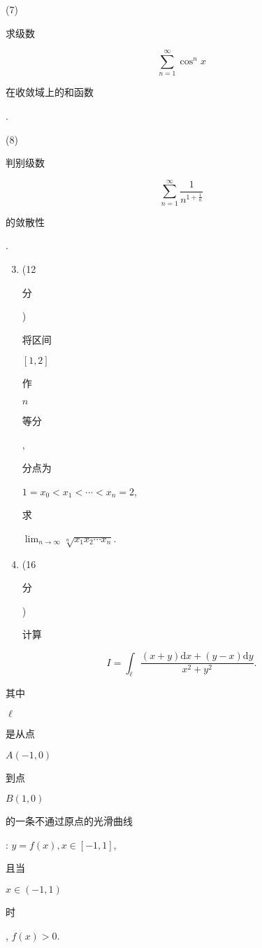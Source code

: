 \documentclass[10pt]{article}
\begin{document}
(7) \begin{CJK}{UTF8}{mj}求级数\end{CJK}
$$
\sum_{n=1}^{\infty} \cos ^{n} x
$$
\begin{CJK}{UTF8}{mj}在收敛域上的和函数\end{CJK}.

(8) \begin{CJK}{UTF8}{mj}判别级数\end{CJK}
$$
\sum_{n=1}^{\infty} \frac{1}{n^{1+\frac{1}{n}}}
$$
\begin{CJK}{UTF8}{mj}的敛散性\end{CJK}.

\begin{enumerate}
  \setcounter{enumi}{2}
  \item (12 \begin{CJK}{UTF8}{mj}分\end{CJK}) \begin{CJK}{UTF8}{mj}将区间\end{CJK} $[1,2]$ \begin{CJK}{UTF8}{mj}作\end{CJK} $n$ \begin{CJK}{UTF8}{mj}等分\end{CJK}, \begin{CJK}{UTF8}{mj}分点为\end{CJK} $1=x_{0}<x_{1}<\cdots<x_{n}=2$, \begin{CJK}{UTF8}{mj}求\end{CJK} $\lim _{n \rightarrow \infty} \sqrt[n]{x_{1} x_{2} \cdots x_{n}}$.

  \item (16 \begin{CJK}{UTF8}{mj}分\end{CJK}) \begin{CJK}{UTF8}{mj}计算\end{CJK}

\end{enumerate}
$$
I=\int_{\ell} \frac{(x+y) \mathrm{d} x+(y-x) \mathrm{d} y}{x^{2}+y^{2}} .
$$
\begin{CJK}{UTF8}{mj}其中\end{CJK} $\ell$ \begin{CJK}{UTF8}{mj}是从点\end{CJK} $A(-1,0)$ \begin{CJK}{UTF8}{mj}到点\end{CJK} $B(1,0)$ \begin{CJK}{UTF8}{mj}的一条不通过原点的光滑曲线\end{CJK}: $y=f(x), x \in[-1,1]$, \begin{CJK}{UTF8}{mj}且当\end{CJK} $x \in(-1,1)$ \begin{CJK}{UTF8}{mj}时\end{CJK}, $f(x)>0$.
\end{document}
